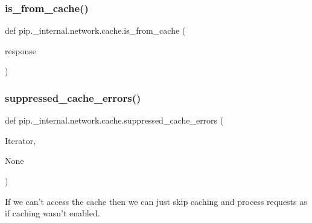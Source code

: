 \subsubsection{\texorpdfstring{is\+\_\+from\+\_\+cache()}{is\_from\_cache()}}
{\footnotesize\ttfamily def pip.\+\_\+internal.\+network.\+cache.\+is\+\_\+from\+\_\+cache (\begin{DoxyParamCaption}\item[{}]{response }\end{DoxyParamCaption})}

\mbox{\label{namespacepip_1_1__internal_1_1network_1_1cache_a9f176df75f4d12bd9d53d7bb66ea610d}} 
\subsubsection{\texorpdfstring{suppressed\+\_\+cache\+\_\+errors()}{suppressed\_cache\_errors()}}
{\footnotesize\ttfamily def pip.\+\_\+internal.\+network.\+cache.\+suppressed\+\_\+cache\+\_\+errors (\begin{DoxyParamCaption}\item[{}]{Iterator,  }\item[{}]{None }\end{DoxyParamCaption})}

\begin{DoxyVerb}If we can't access the cache then we can just skip caching and process
requests as if caching wasn't enabled.
\end{DoxyVerb}
 